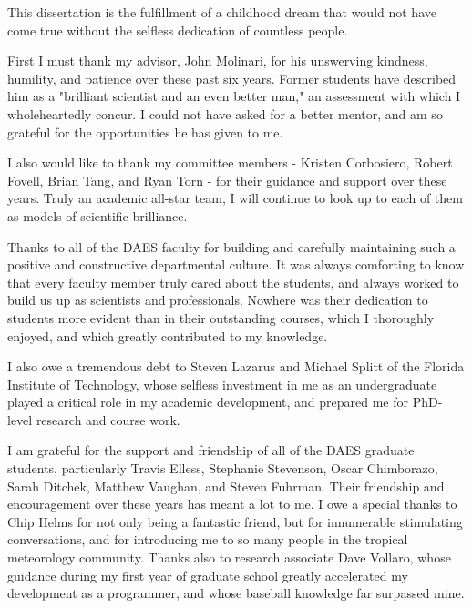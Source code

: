  


\indent This dissertation is the fulfillment of a childhood dream that would not have come true without the selfless dedication of countless people.

First I must thank my advisor, John Molinari, for his unswerving kindness, humility, and patience over these past six years.  
Former students have described him as a "brilliant scientist and an even better man," an assessment with which I wholeheartedly concur.  
I could not have asked for a better mentor, and am so grateful for the opportunities he has given to me.

I also would like to thank my committee members - Kristen Corbosiero, Robert Fovell, Brian Tang, and Ryan Torn - for their guidance and support over these years.  
Truly an academic all-star team, I will continue to look up to each of them as models of scientific brilliance.

Thanks to all of the DAES faculty for building and carefully maintaining such a positive and constructive departmental culture.  
It was always comforting to know that every faculty member truly cared about the students, and always worked to build us up as scientists and professionals.  
Nowhere was their dedication to students more evident than in their outstanding courses, which I thoroughly enjoyed, and which greatly contributed to my knowledge.  

I also owe a tremendous debt to Steven Lazarus and Michael Splitt of the Florida Institute of Technology, whose selfless investment in me as an undergraduate played a critical role in my academic development, and prepared me for PhD-level research and course work.

I am grateful for the support and friendship of all of the DAES graduate students, particularly Travis Elless, Stephanie Stevenson, Oscar Chimborazo, Sarah Ditchek, Matthew Vaughan, and Steven Fuhrman.  
Their friendship and encouragement over these years has meant a lot to me.
I owe a special thanks to Chip Helms for not only being a fantastic friend, but for innumerable stimulating conversations, and for introducing me to so many people in the tropical meteorology community.  
Thanks also to research associate Dave Vollaro, whose guidance during my first year of graduate school greatly accelerated my development as a programmer, and whose baseball knowledge far surpassed mine.

